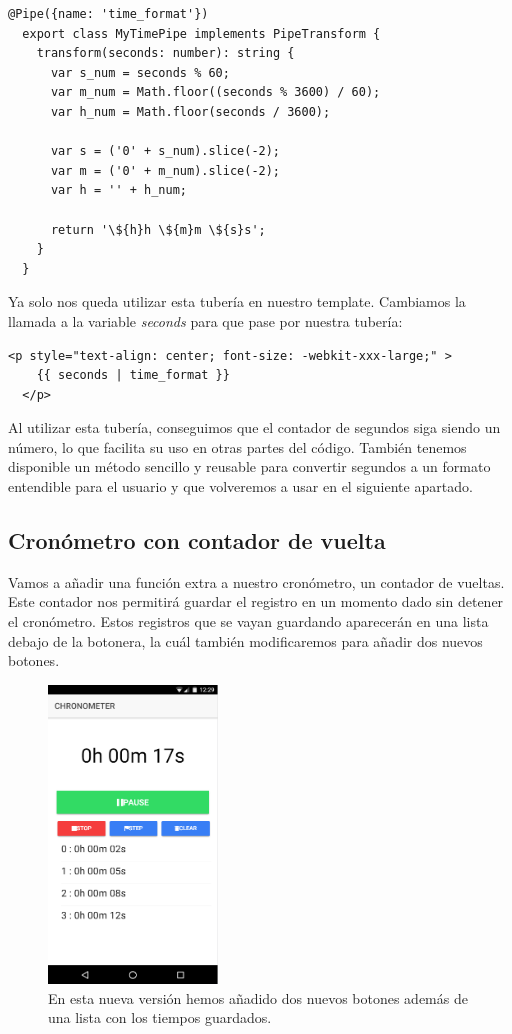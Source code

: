 \begin{lstlisting}[style=htmlcssjs,frame=tlrb,xleftmargin={0.2cm}]
  @Pipe({name: 'time_format'})
  export class MyTimePipe implements PipeTransform {
    transform(seconds: number): string {
      var s_num = seconds % 60;
      var m_num = Math.floor((seconds % 3600) / 60);
      var h_num = Math.floor(seconds / 3600);

      var s = ('0' + s_num).slice(-2);
      var m = ('0' + m_num).slice(-2);
      var h = '' + h_num;

      return '\${h}h \${m}m \${s}s';
    }
  }
\end{lstlisting}

Ya solo nos queda utilizar esta tubería en nuestro template. Cambiamos la llamada a la variable \emph{seconds} para que pase por nuestra tubería:

\begin{lstlisting}[style=htmlcssjs,frame=tlrb,xleftmargin={0.2cm}]
  <p style="text-align: center; font-size: -webkit-xxx-large;" >
    {{ seconds | time_format }}
  </p>
\end{lstlisting}

Al utilizar esta tubería, conseguimos que el contador de segundos siga siendo un número, lo que facilita su uso en otras partes del código. También tenemos disponible un método sencillo y reusable para convertir segundos a un formato entendible para el usuario y que volveremos a usar en el siguiente apartado.

\subsection{Cronómetro con contador de vuelta}

Vamos a añadir una función extra a nuestro cronómetro, un contador de vueltas. Este contador nos permitirá guardar el registro en un momento dado sin detener el cronómetro. Estos registros que se vayan guardando aparecerán en una lista debajo de la botonera, la cuál también modificaremos para añadir dos nuevos botones.

\begin{figure}[H]
\centering
  \includegraphics[width=0.4\textwidth]{Figures/ch2/Chronometer/chronometer_v2}
  \caption{En esta nueva versión hemos añadido dos nuevos botones además de una lista con los tiempos guardados.}
\end{figure}

